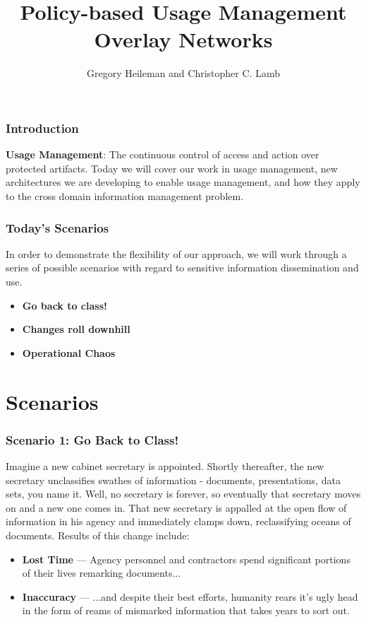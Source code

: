 \documentclass[t,handout, 10pt]{beamer}
\title{Policy-based Usage Management Overlay Networks}
\author [Greg, Chris]{Gregory Heileman and Christopher C. Lamb}
\institute[University of New Mexico]{
\inst {}Department of Electrical and Computer Engineering\\
University of New Mexico}
\date{}
\begin{document}
\begin{frame}
\titlepage
\end{frame}


\begin{frame}
\frametitle{Introduction}
\textbf{Usage Management}: The continuous control of access and action over protected artifacts.
\newline
\newline
\pause
Today we will cover our work in usage management, new architectures we are developing to enable usage management, and how they apply to the cross domain information management problem.
\tableofcontents 
\end{frame}

\begin{frame}
\frametitle{Today's Scenarios}
In order to demonstrate the flexibility of our approach, we will work through a series of possible scenarios with regard to sensitive information dissemination and use.
\newline
\pause
\begin{itemize}
\item \textbf{Go back to class!}
\pause
\item \textbf{Changes roll downhill}
\pause
\item \textbf{Operational Chaos}
\end{itemize}
\end{frame}

\section{Scenarios}

\begin{frame}
\frametitle{Scenario 1: Go Back to Class!}
Imagine a new cabinet secretary is appointed.  Shortly thereafter, the new secretary  unclassifies swathes of information - documents, presentations, data sets, you name it.  Well, no secretary is forever, so eventually that secretary moves on and a new one comes in.  That new secretary is appalled at the open flow of information in his agency and immediately clamps down, reclassifying oceans of documents.
\newline
\newline
Results of this change include:
\newline
\pause
\begin{itemize}
\item \textbf{Lost Time} --- Agency personnel and contractors spend significant portions of their lives remarking documents...
\pause
\item \textbf{Inaccuracy} --- ...and despite their best efforts, humanity rears it's ugly head in the form of reams of mismarked information that takes years to sort out.
\end{itemize}
\end{frame}
\end{document}
